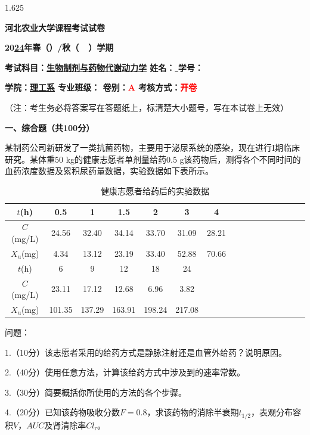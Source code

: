 \documentclass[12pt, b5paper]{article}
\newcommand*{\cred}{\textcolor{red}}
\begin{document}
\begin{spacing}{1.625}

\centerline{{\LARGE \bf{河北农业大学课程考试试卷}}}

\centerline{\bf{\large 20\underline{24}年春（\quad）/秋（\ \surd \ ）学期}}

{\bf{考试科目：\underline{生物制剂与药物代谢动力学} \hfill 姓名：\underline{ \qquad \qquad} \hfill 学号：\underline{ \qquad \qquad \qquad}}}

{\bf{学院：\underline{\quad 理工系\quad } \hfill 专业班级：\underline{\qquad \qquad \qquad \qquad} \hfill 卷别：\cred{A} \hfill 考核方式：\cred{开卷}}}

（注：考生务必将答案写在答题纸上，标清楚大小题号，写在本试卷上无效）

\bigskip


{\bf{一、综合题（共100分）}}

\qquad 某制药公司新研发了一类抗菌药物，主要用于泌尿系统的感染，现在进行I期临床研究。某体重50 kg的健康志愿者单剂量给药0.5 g该药物后，测得各个不同时间的血药浓度数据及累积尿药量数据，实验数据如下表所示。

\begin{table}[htpb]
    \centering
    \caption{健康志愿者给药后的实验数据}
    \smallskip
    \begin{tabular}{c|ccccccccccccccc}
        \bottomrule
        $t$(h) & 0.5 & 1 & 1.5 & 2 & 3 & 4 \\ \hline
        $C$(mg/L) & 24.56 & 32.40 & 34.14 & 33.70 & 31.09 & 28.21 \\ \hline
        $X_\mathrm{u}$(mg) & 4.34 & 13.12 & 23.19 & 33.40 & 52.88 & 70.66  \\ \toprule \bottomrule
        $t$(h) & 6 & 9 & 12 & 18 & 24 \\ \hline
        $C$(mg/L) & 23.11 & 17.12 & 12.68 & 6.96 & 3.82\\ \hline
        $X_\mathrm{u}$(mg) & 101.35 & 137.29 & 163.91 & 198.24 & 217.08 \\ \toprule 
    \end{tabular}
\end{table}


问题：

1.（10分）该志愿者采用的给药方式是静脉注射还是血管外给药？说明原因。

2.（40分）使用任意方法，计算该给药方式中涉及到的速率常数。

3.（30分）简要概括你所使用的方法的各个步骤。

4.（20分）已知该药物吸收分数$F=0.8$，求该药物的消除半衰期$t_{1/2}$，表观分布容积$V$，$AUC$及肾清除率$Cl_\mathrm{r}$。


\end{spacing}
\end{document}

